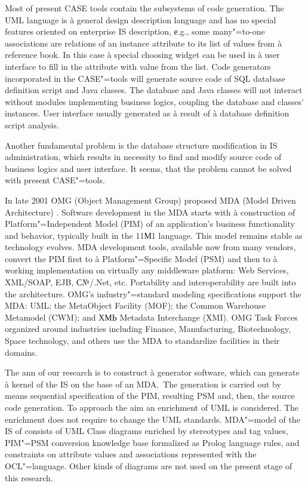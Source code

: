 \documentclass{intech}
\begin{document}
Most of present CASE tools contain the subsystems of code generation. The UML language is à general design description language and has no special features oriented on enterprise IS description, е.g., some many"=to-one associations are relations of an instance attribute to its list of values from à reference book. In this case à special choosing widget can be used in à user interface to fill in the attribute with value from the list. Code generators incorporated in the CASE"=tools will generate source code of SQL database definition script and Java classes. The database and Java classes will not interact without modules implementing business logics, coupling the database and classes' instances. User interface usually generated as à result of à database definition script analysis.

Another fundamental problem is the database structure modification in IS administration, which results in necessity to find and modify source code of business logics and user interface. It seems, that the problem cannot be solved with present CASE"=tools.

In late 2001 OMG (Object Management Group) proposed MDA (Model Driven Architecture) \cite{b3}. Software development in the MDA starts with à construction of Platform"=Independent Model (PIM) of an application's business functionality and behavior, typically built in the 11М1 language. This model remains stable as technology evolves. MDA development tools, available now from many vendors, convert the PIM first to à Platform"=Specific Model (PSM) and then to à working implementation on virtually any middleware platform: Web Services, XML/SOAP, EJB, С№/.Net, etc. Portability and interoperability are built into the architecture. OMG's industry"=standard modeling specifications support the MDA: UML; the MetaObject Facility (MOF); the Common Warehouse Metamodel (CWM); and ХМЬ Metadata Interchange (XMI). OMG Task Forces organized around industries including Finance, Manufacturing, Biotechnology, Space technology, and others use the MDA to standardize facilities in their domains.

The ann of our research is to construct à generator software, which can generate à kernel of the IS on the base of an MDA.~The generation is carried out by means sequential specification of the PIM, resulting PSM and, then, the source code generation. To approach the aim an enrichment of UML is considered. The enrichment does not require to change the UML standards. MDA"=model of the IS of consists of UML Class diagrams enriched by stereotypes and tag values, PIM"=PSM conversion knowledge base formalized as Prolog language rules, and constraints on attribute values and associations represented with the OCL"=language. Other kinds of diagrams are not used on the present stage of this research.
\end{document}
